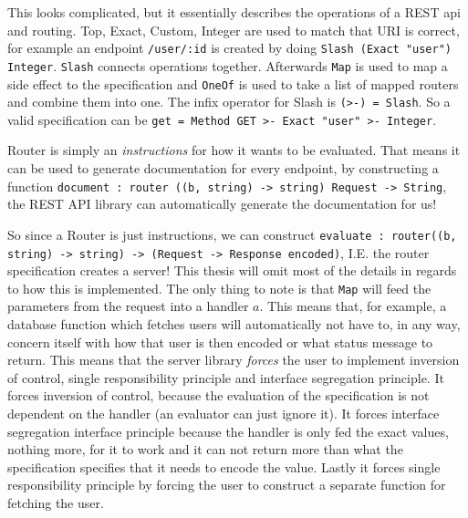 This looks complicated, but it essentially describes the operations of a REST
api and routing. Top, Exact, Custom, Integer are used to match that URI is
correct, for example an endpoint \texttt{/user/:id} is created by doing
\texttt{Slash (Exact "user") Integer}. \texttt{Slash} connects operations
together. Afterwards \texttt{Map} is used to map a side effect to the
specification and \texttt{OneOf} is used to take a list of mapped routers and
combine them into one. The infix operator for Slash is \texttt{(>-) = Slash}. So
a valid specification can be \texttt{get = Method GET >- Exact "user" >-
Integer}.

Router is simply an \textit{instructions} for how it wants to be evaluated. That
means it can be used to generate documentation for every endpoint, by
constructing a function \texttt{document : router ((b, string) -> string)
Request -> String}, the REST API library can automatically generate the
documentation for us!

So since a Router is just instructions, we can construct \texttt{evaluate :
router((b, string) -> string) -> (Request -> Response encoded)}, I.E. the router
specification creates a server! This thesis will omit most of the details in
regards to how this is implemented. The only thing to note is that \texttt{Map}
will feed the parameters from the request into a handler $a$. This means that,
for example, a database function which fetches users will automatically not have
to, in any way, concern itself with how that user is then encoded or what status
message to return. This means that the server library \textit{forces} the user
to implement inversion of control, single responsibility principle and interface
segregation principle. It forces inversion of control, because the evaluation of
the specification is not dependent on the handler (an evaluator can just ignore
it). It forces interface segregation interface principle because the handler is
only fed the exact values, nothing more, for it to work and it can not return
more than what the specification specifies that it needs to encode the value.
Lastly it forces single responsibility principle by forcing the user to
construct a separate function for fetching the user.

